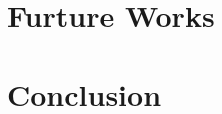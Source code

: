 \documentclass[12pt, letterpaper]{report}   %
\begin{document}
\chapter{Furture Works}
\label{ch:furthers}


% 


% 

\chapter{Conclusion}
\label{ch:conclusion}

\cleardoublepage


\nocite{tikzDevice,plotly,reshape,Rcomputing,Florida2000}




\appendix
\begingroup
  \hypersetup{linkbordercolor=white,linkcolor=black,
    filecolor=black, urlcolor=black} 
\listofappendixfigures
\endgroup





% 
\end{document}
